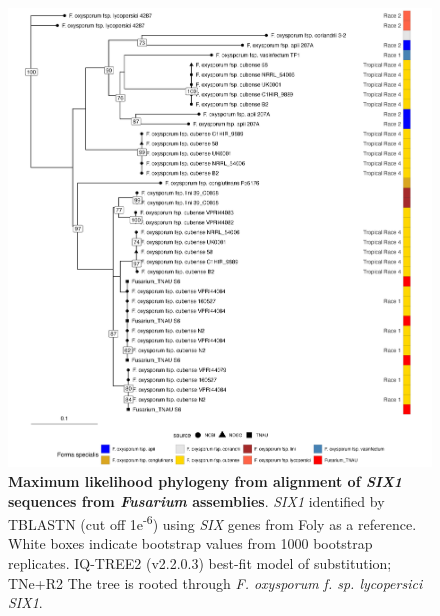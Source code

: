 \begin{figure}[htp!]
  \centering
  \includegraphics[width=\textwidth]{Figures/FusSIX1.phylo.png}
  \caption[Maximum likelihood phylogeny from alignment of \textit{SIX1} sequences from \textit{Fusarium} assemblies]{\textbf{Maximum likelihood phylogeny from alignment of \textit{SIX1} sequences from \textit{Fusarium} assemblies}. \textit{SIX1} identified by TBLASTN (cut off 1e\textsuperscript{-6}) using \textit{SIX} genes from \acl{Foly} as a reference. White boxes indicate bootstrap values from 1000 bootstrap replicates. IQ-TREE2 (v2.2.0.3) best-fit model of substitution; TNe+R2 The tree is rooted through \textit{F. oxysporum f. sp. lycopersici} \textit{SIX1}.}
  \label{fig:FusSIX1}
\end{figure}

